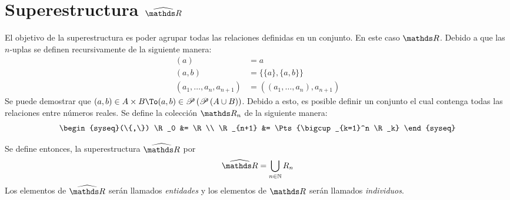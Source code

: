 \section{Superestructura \texorpdfstring{$\Rh$}{R}}

El objetivo de la superestructura es poder agrupar todas las relaciones
definidas en un conjunto. En este caso $\R$. Debido a que las
$n$-uplas se definen recursivamente de la siguiente manera:
\begin{align*}
  (a) &= a\\
  (a,b) &= \{\{a\}, \{a,b\}\}\\
  (a_1, \dots, a_n, a_{n+1}) &= ((a_1, \dots, a_n), a_{n+1})
\end{align*}
Se puede demostrar que $(a,b) \in A\times B \To
(a,b) \in \Pts{\Pts{A \cup B}}$. Debido a esto, es posible definir un
conjunto el cual contenga todas las relaciones entre números reales. Se
define la colección $\R_n$ de la siguiente manera:
\[
  \begin{syseq}(\{,\})
    \R_0 &= \R\\
    \R_{n+1} &= \Pts{\bigcup_{k=1}^n \R_k}
  \end{syseq}
\]

Se define entonces, la superestructura $\Rh$ por
\[\Rh = \bigcup_{n\in\N} R_n\]
Los elementos de $\Rh$ serán llamados \emph{entidades} y los elementos
de $\R$ serán llamados \emph{individuos}.

